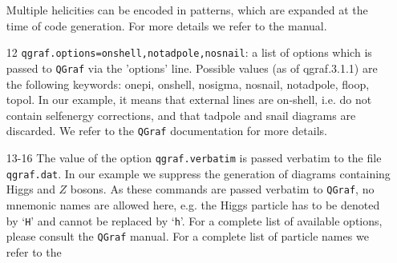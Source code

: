 \documentclass[11pt,a4paper]{refrep}
\newcommand{\qgraf}{{\tt QGraf}\xspace}
\begin{document}
\begin{enumerate}
 Multiple helicities can be encoded in patterns, which are expanded
    at the time of code generation. For more details we refer to the manual.      
\item[12]  \texttt{qgraf.options=onshell,notadpole,nosnail}: 
a list of options which is passed to \qgraf{} via the 'options' line.
Possible values (as of qgraf.3.1.1) are the following keywords:
 onepi, onshell, nosigma, nosnail, notadpole, floop, topol.        
In our example, it means that external lines are on-shell, i.e. 
do not contain selfenergy corrections, and that tadpole and snail diagrams are discarded.    
We refer to the \qgraf{} documentation for more details.
\item[13-16] 
 The value of the option \texttt{qgraf.verbatim} is
passed verbatim to the file \texttt{qgraf.dat}.
In our example we suppress the generation of diagrams containing Higgs and $Z$ bosons.
As these commands are passed verbatim to \qgraf, no mnemonic names
are allowed here, e.g. the Higgs particle has to be denoted by
`\lstinline[basicstyle=\ttfamily]{H}' and cannot be replaced by
`\lstinline[basicstyle=\ttfamily]{h}'.
For a complete list of available options, please consult the
\qgraf{} manual. For a complete list of particle names we refer to the 

\end{enumerate}
\end{document}
